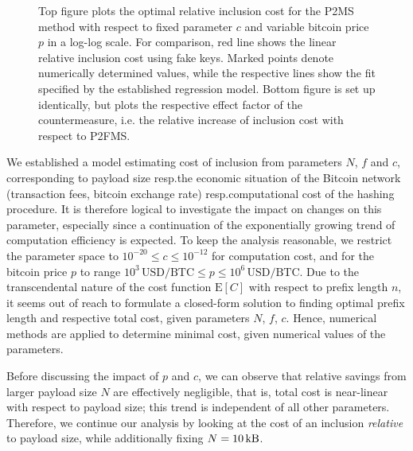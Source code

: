 \documentclass[a4paper,11pt,titlepage]{scrbook}
\begin{document}
\begin{figure}[p]
    \caption[Optimal relative inclusion cost with respect to arbitrary parameters $c$ and bitcoin price $p$]{Top figure plots the optimal relative inclusion cost for the P2MS method with respect to fixed parameter $c$ and variable bitcoin price $p$ in a log-log scale. For comparison, red line shows the linear relative inclusion cost using fake keys.
    Marked points denote numerically determined values, while the respective lines show the fit specified by the established regression model. Bottom figure is set up identically, but plots the respective effect factor of the countermeasure, i.e. the relative increase of inclusion cost with respect to P2FMS.}
    \label{figure:fit}
\end{figure}

We established a model estimating cost of inclusion from parameters $N$, $f$ and $c$, corresponding to payload size resp.\@ the economic situation of the Bitcoin network (transaction fees, bitcoin exchange rate) resp.\@ computational cost of the hashing procedure.
It is therefore logical to investigate the impact on changes on this parameter, especially since a continuation of the exponentially growing trend of computation efficiency is expected. %
To keep the analysis reasonable, we restrict the parameter space to $10^{-20} \leq c \leq 10^{-12}$ for computation cost, and for the bitcoin price $p$ to range $10^3\,\text{USD}/\text{BTC} \leq p \leq 10^6\,\text{USD}/\text{BTC}$.
Due to the transcendental nature of the cost function $\mathrm{E}[C]$ with respect to prefix length $n$, it seems out of reach to formulate a closed-form solution to finding optimal prefix length and respective total cost, given parameters $N$, $f$, $c$.
Hence, numerical methods are applied to determine minimal cost, given numerical values of the parameters.

Before discussing the impact of $p$ and $c$, we can observe that relative savings from larger payload size $N$ are effectively negligible, that is, total cost is near-linear with respect to payload size;
this trend is independent of all other parameters.
Therefore, we continue our analysis by looking at the cost of an inclusion \emph{relative} to payload size, while additionally fixing $N=\SI{10}{\kilo\byte}$.
\end{document}
